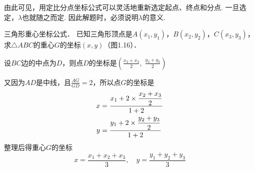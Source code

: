 由此可见，用定比分点坐标公式可以灵活地重新选定起点、终点和分点. 一旦选定，$\lambda$也就随之而定. 因此解题时，必须说明$\lambda$的意义.

\begin{example}
    三角形重心坐标公式．
已知三角形顶点是$A(x_1,y_1)$，$B(x_2,y_2)$，$C(x_3,y_3)$，求$\triangle ABC$的重心$G$的坐标$(x,y)$（图1.16）．
\end{example}

\begin{solution}
设$BC$边的中点为$D$，则点$D$的坐标是$\left(\frac{x_2+x_3}{2},\; \frac{y_2+y_3}{2}\right)$

\noindent
\begin{minipage}{.55\textwidth}
又因为$AD$是中线，且$\frac{AG}{GD}=2$，所以点$G$的坐标是
\[\begin{split}
    x&=\dfrac{x_1+2\times \dfrac{x_2+x_3}{2}}{1+2}\\
    y&=\dfrac{y_1+2\times \dfrac{y_2+y_3}{2}}{1+2}
\end{split}\]
整理后得重心$G$的坐标
    \[x=\frac{x_1+x_2+x_3}{3},\quad y=\frac{y_1+y_2+y_3}{3}\]    
\end{minipage}\hfill
\begin{minipage}{.45\textwidth}
\centering
{}
\end{minipage}
\end{solution}

